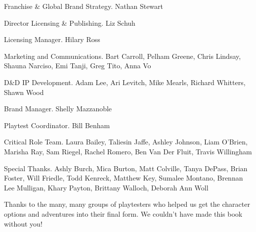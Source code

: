 \documentclass[10pt,a4paper,twoside,bg=print,twocolumn,openany,nodeprecatedcode]{dndbook}
\begin{document}
\begin{description}
\begin{multicols}{2}
\item[Franchise \& Global Brand Strategy.]
Nathan Stewart

\item[Director Licensing \& Publishing.]
Liz Schuh

\item[Licensing Manager.]
Hilary Ross

\item[Marketing and Communications.]
Bart Carroll, Pelham Greene, Chris Lindsay, Shauna Narciso, Emi Tanji, Greg Tito, Anna Vo

\item[D\&D IP Development.]
Adam Lee, Ari Levitch, Mike Mearls, Richard Whitters, Shawn Wood

\item[Brand Manager.]
Shelly Mazzanoble

\item[Playtest Coordinator.]
Bill Benham

\item[Critical Role Team.]
Laura Bailey, Taliesin Jaffe, Ashley Johnson, Liam O'Brien, Marisha Ray, Sam Riegel, Rachel Romero, Ben Van Der Fluit, Travis Willingham

\item[Special Thanks.]
Ashly Burch, Mica Burton, Matt Colville, Tanya DePass, Brian Foster, Will Friedle, Todd Kenreck, Matthew Key, Sumalee Montano, Brennan Lee Mulligan, Khary Payton, Brittany Walloch, Deborah Ann Woll

\end{multicols}

\end{description}

Thanks to the many, many groups of playtesters who helped us get the character options and adventures into their final form. We couldn't have made this book without you!
\end{document}

